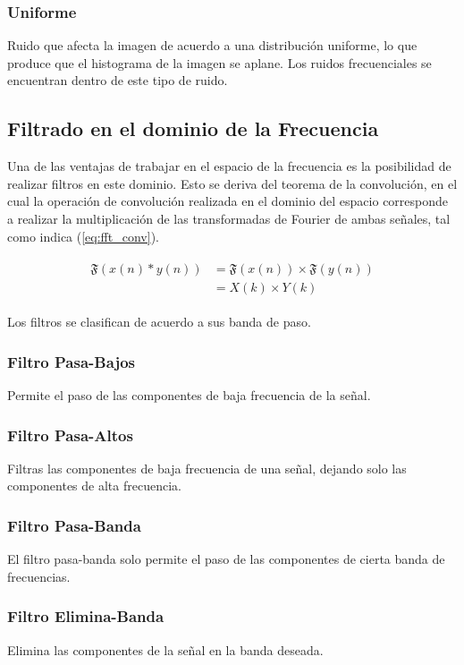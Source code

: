 \documentclass[
  letterpaper,
  twocolumn,
  9pt,
  journal,
  final]{IEEEtran}
\begin{document}
\subsubsection{Uniforme}
Ruido que afecta la imagen de acuerdo a una distribución uniforme, lo que produce que el histograma de la imagen se aplane. Los ruidos frecuenciales se encuentran dentro de este tipo de ruido.


\subsection{Filtrado en el dominio de la Frecuencia}

Una de las ventajas de trabajar en el espacio de la frecuencia es la posibilidad de realizar filtros en este dominio. Esto se deriva del teorema de la convolución, en el cual la operación de convolución realizada en el dominio del espacio corresponde a realizar la multiplicación de las transformadas de Fourier de ambas señales, tal como indica (\ref{eq:fft_conv}).

\begin{align}
	\begin{split}
	\mathfrak{F} (x(n) * y(n) ) &= \mathfrak{F}(x(n)) \times \mathfrak{F}(y(n))\\
	&= X(k) \times Y(k)
	\end{split}\label{eq:fft_conv}
\end{align}


Los filtros se clasifican de acuerdo a sus banda de paso.

\subsubsection{Filtro Pasa-Bajos}
Permite el paso de las componentes de baja frecuencia de la señal.

\subsubsection{Filtro Pasa-Altos}
Filtras las componentes de baja frecuencia de una señal, dejando solo las componentes de alta frecuencia.

\subsubsection{Filtro Pasa-Banda} El filtro pasa-banda solo permite el paso de las componentes de cierta banda de frecuencias.

\subsubsection{Filtro Elimina-Banda} Elimina las componentes de la señal en la banda deseada.
\end{document}
